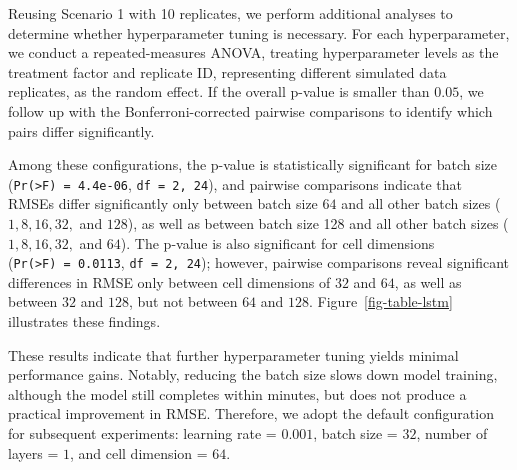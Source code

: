 \documentclass[
  letterpaper,
  double,
  12pt,
  1.0in]{beavtex}
\begin{document}
Reusing Scenario 1 with 10 replicates, we perform additional analyses to
determine whether hyperparameter tuning is necessary. For each
hyperparameter, we conduct a repeated-measures ANOVA, treating
hyperparameter levels as the treatment factor and replicate ID,
representing different simulated data replicates, as the random effect.
If the overall p-value is smaller than \(0.05\), we follow up with the
Bonferroni-corrected pairwise comparisons to identify which pairs differ
significantly.

Among these configurations, the p-value is statistically significant for
batch size (\texttt{Pr(\textgreater{}F)\ =\ 4.4e-06},
\texttt{df\ =\ 2,\ 24}), and pairwise comparisons indicate that RMSEs
differ significantly only between batch size \(64\) and all other batch
sizes (\(1, 8, 16, 32,\) and \(128\)), as well as between batch size 128
and all other batch sizes (\(1, 8, 16, 32,\) and \(64\)). The p-value is
also significant for cell dimensions
(\texttt{Pr(\textgreater{}F)\ =\ 0.0113}, \texttt{df\ =\ 2,\ 24});
however, pairwise comparisons reveal significant differences in RMSE
only between cell dimensions of \(32\) and \(64\), as well as between
\(32\) and \(128\), but not between \(64\) and \(128\).
Figure~\ref{fig-table-lstm} illustrates these findings.

These results indicate that further hyperparameter tuning yields minimal
performance gains. Notably, reducing the batch size slows down model
training, although the model still completes within minutes, but does
not produce a practical improvement in RMSE. Therefore, we adopt the
default configuration for subsequent experiments: learning rate =
\(0.001\), batch size = \(32\), number of layers = \(1\), and cell
dimension = \(64\).
\end{document}
